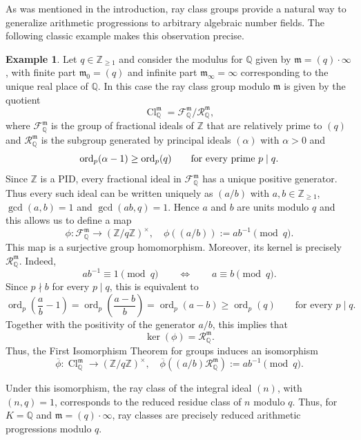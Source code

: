 \documentclass[11pt, reqno]{amsart}
\numberwithin{equation}{section}
\newcommand{\Z}{\mathbb{Z}}
\newcommand{\Q}{\mathbb{Q}}
\newcommand{\Cl}{\operatorname{Cl}}
\newcommand{\ord}[1]{\operatorname{ord}#1}
\theoremstyle{definition}
\newtheorem{example}[theorem]{Example}
\begin{document}
As was mentioned in the introduction, ray class groups provide a natural way to generalize arithmetic progressions to arbitrary algebraic number fields. The following classic example makes this observation precise.

\begin{example}\label{ex:ray-class-groups-over-Q}
Let $q \in \Z_{\geq 1}$ and consider the modulus for $\Q$ given by $\mathfrak{m} = (q) \cdot \infty$, with finite part $\mathfrak{m}_0=(q)$ and infinite part  $\mathfrak{m}_{\infty} = \infty$ corresponding to the unique real place of $\Q$. In this case the ray class group modulo $\mathfrak{m}$ is given by the quotient
\[
\Cl_{\Q}^{\mathfrak{m}} = \mathcal{F}_{\Q}^{\mathfrak{m}}/\mathcal{R}_{\Q}^{\mathfrak{m}},
\]
where $\mathcal{F}_{\Q}^{\mathfrak{m}}$ is the group of fractional ideals of $\Z$ that are relatively prime to $(q)$ and $\mathcal{R}_{\Q}^{\mathfrak{m}}$ is the subgroup generated by principal ideals $(\alpha)$ with $\alpha>0$ and
\[
\ord_p(\alpha-1)\geq \ord_p(q)
\qquad\text{for every prime }p\mid q.
\]
Since $\Z$ is a PID, every fractional ideal in $\mathcal{F}_{\Q}^{\mathfrak{m}}$ has a unique positive generator. Thus every such ideal can be written uniquely as $(a/b)$ with $a, b \in \Z_{\geq 1}$, $\gcd{(a, b)} = 1$ and $\gcd{(ab, q)} = 1$. Hence $a$ and $b$ are units modulo $q$ and this allows us to define a map
\[
\phi \colon \mathcal{F}_{\Q}^{\mathfrak{m}} \longrightarrow (\Z/q\Z)^{\times}, \quad \phi((a/b)) := a b^{-1} \pmod{q}.
\]
This map is a surjective group homomorphism. Moreover, its kernel is precisely $\mathcal{R}_{\mathbb{Q}}^{\mathfrak{m}}$. Indeed,
\[
ab^{-1}\equiv 1 \pmod q
\qquad\Longleftrightarrow\qquad
a\equiv b \pmod q.
\]
Since $p\nmid b$ for every $p\mid q$, this is equivalent to
\[
\operatorname{ord}_p\left(\frac{a}{b}-1\right)
=
\operatorname{ord}_p\left(\frac{a-b}{b}\right)
=
\operatorname{ord}_p(a-b)
\geq
\operatorname{ord}_p(q)
\qquad\text{for every }p\mid q.
\]
Together with the positivity of the generator $a/b$, this implies that
\[
\ker(\phi)=\mathcal{R}_{\mathbb{Q}}^{\mathfrak{m}}.
\]
Thus, the First Isomorphism Theorem for groups induces an isomorphism
\[
\overline{\phi} \colon \Cl_{\Q}^{\mathfrak{m}} \longrightarrow (\Z/q\Z)^{\times}, \quad \overline{\phi}((a/b) \mathcal{R}_{\Q}^{\mathfrak{m}}) := a b^{-1} \pmod{q}.
\]

Under this isomorphism, the ray class of the integral ideal $(n)$, with $(n,q)=1$, corresponds to the reduced residue class of $n$ modulo $q$. Thus, for $K=\mathbb{Q}$ and $\mathfrak{m}=(q)\cdot\infty$, ray classes are precisely reduced arithmetic progressions modulo $q$.
\end{example}
\end{document}
